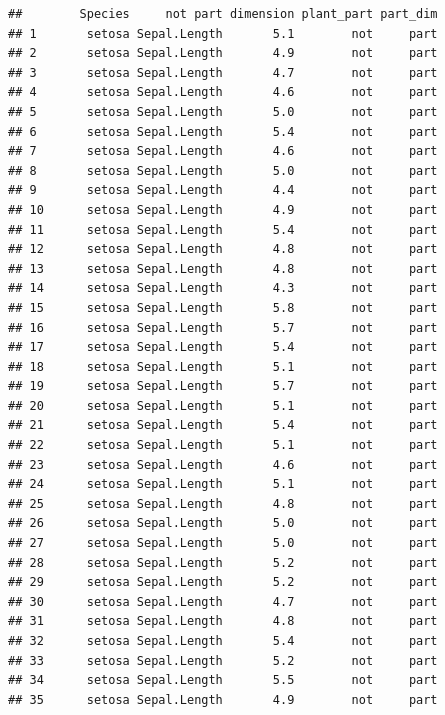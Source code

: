 \documentclass[krantz2]{krantz}\usepackage{knitr}%
\begin{document}
\begin{knitrout}\footnotesize
{}\color{fgcolor}\begin{kframe}
\begin{alltt}
\end{alltt}
\begin{verbatim}
##        Species     not part dimension plant_part part_dim
## 1       setosa Sepal.Length       5.1        not     part
## 2       setosa Sepal.Length       4.9        not     part
## 3       setosa Sepal.Length       4.7        not     part
## 4       setosa Sepal.Length       4.6        not     part
## 5       setosa Sepal.Length       5.0        not     part
## 6       setosa Sepal.Length       5.4        not     part
## 7       setosa Sepal.Length       4.6        not     part
## 8       setosa Sepal.Length       5.0        not     part
## 9       setosa Sepal.Length       4.4        not     part
## 10      setosa Sepal.Length       4.9        not     part
## 11      setosa Sepal.Length       5.4        not     part
## 12      setosa Sepal.Length       4.8        not     part
## 13      setosa Sepal.Length       4.8        not     part
## 14      setosa Sepal.Length       4.3        not     part
## 15      setosa Sepal.Length       5.8        not     part
## 16      setosa Sepal.Length       5.7        not     part
## 17      setosa Sepal.Length       5.4        not     part
## 18      setosa Sepal.Length       5.1        not     part
## 19      setosa Sepal.Length       5.7        not     part
## 20      setosa Sepal.Length       5.1        not     part
## 21      setosa Sepal.Length       5.4        not     part
## 22      setosa Sepal.Length       5.1        not     part
## 23      setosa Sepal.Length       4.6        not     part
## 24      setosa Sepal.Length       5.1        not     part
## 25      setosa Sepal.Length       4.8        not     part
## 26      setosa Sepal.Length       5.0        not     part
## 27      setosa Sepal.Length       5.0        not     part
## 28      setosa Sepal.Length       5.2        not     part
## 29      setosa Sepal.Length       5.2        not     part
## 30      setosa Sepal.Length       4.7        not     part
## 31      setosa Sepal.Length       4.8        not     part
## 32      setosa Sepal.Length       5.4        not     part
## 33      setosa Sepal.Length       5.2        not     part
## 34      setosa Sepal.Length       5.5        not     part
## 35      setosa Sepal.Length       4.9        not     part

\end{verbatim}
\end{kframe}
\end{knitrout}
\end{document}
